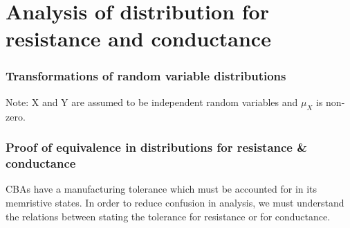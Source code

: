 
\chapter{Analysis of distribution for resistance and conductance}
\label{appendix:rv_distribution}

\vspace{2em}


\subsection{Transformations of random variable distributions}


\noindent
Note: X and Y are assumed to be independent random variables and $\mu_X$ is non-zero.

\subsection{Proof of equivalence in distributions for resistance \& conductance}

\noindent
\Acfp{CBA} have a manufacturing tolerance which must be accounted for in its memristive states. In order to reduce confusion in analysis, we must understand the relations between stating the tolerance for resistance or for conductance.

